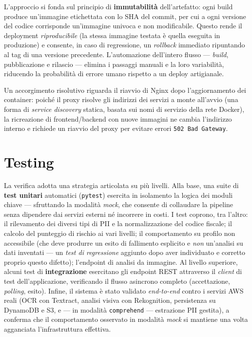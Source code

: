 \documentclass[11pt,a4paper]{article}
\begin{document}
L'approccio si fonda sul principio di \textbf{immutabilità} dell'artefatto: ogni build
produce un'immagine etichettata con lo SHA del commit, per cui a ogni versione del
codice corrisponde un'immagine univoca e non modificabile. Questo rende il deployment
\emph{riproducibile} (la stessa immagine testata è quella eseguita in produzione) e
consente, in caso di regressione, un \emph{rollback} immediato ripuntando al tag di una
versione precedente. L'automazione dell'intero flusso --- \emph{build}, pubblicazione e
rilascio --- elimina i passaggi manuali e la loro variabilità, riducendo la probabilità
di errore umano rispetto a un deploy artigianale.

Un accorgimento risolutivo riguarda il riavvio di Nginx dopo l'aggiornamento dei
container: poiché il proxy risolve gli indirizzi dei servizi a monte all'avvio (una
forma di \emph{service discovery} statica, basata sui nomi di servizio della rete
Docker), la ricreazione di frontend/backend con nuove immagini ne cambia l'indirizzo
interno e richiede un riavvio del proxy per evitare errori \texttt{502 Bad Gateway}.

\section{Testing}
La verifica adotta una strategia articolata su più livelli. Alla base, una suite di
\textbf{test unitari} automatici (\texttt{pytest}) esercita in isolamento la logica dei
moduli chiave --- sfruttando la modalità \emph{mock}, che consente di collaudare la
pipeline senza dipendere dai servizi esterni né incorrere in costi. I test coprono, tra
l'altro: il rilevamento dei diversi tipi di PII e la normalizzazione del codice fiscale;
il calcolo del punteggio di rischio ai vari livelli; il comportamento su profilo non
accessibile (che deve produrre un esito di fallimento esplicito e \emph{non} un'analisi
su dati inventati --- un \emph{test di regressione} aggiunto dopo aver individuato e
corretto proprio questo difetto); l'endpoint di analisi da immagine. Al livello
superiore, alcuni test di \textbf{integrazione} esercitano gli endpoint REST attraverso
il \emph{client} di test dell'applicazione, verificando il flusso asincrono completo
(accettazione, \emph{polling}, esito). Infine, il sistema è stato validato
\emph{end-to-end} contro i servizi AWS reali (OCR con Textract, analisi visiva con
Rekognition, persistenza su DynamoDB e S3, e --- in modalità \texttt{comprehend} ---
estrazione PII gestita), a conferma che il comportamento osservato in
modalità \emph{mock} si mantiene una volta agganciata l'infrastruttura effettiva.
\end{document}
